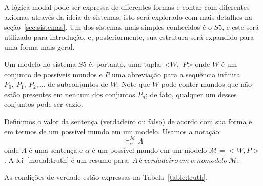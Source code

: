 A lógica modal pode ser expressa de diferentes formas e contar com diferentes
axiomas através da ideia de sistemas, isto será explorado com mais detalhes 
na seção~\ref{sec:sistemas}. Um dos sistemas mais simples conhecidos é o $S5$, e
este será utilizado para introdução, e, posteriormente, sua estrutura será
expandido para uma forma mais geral.

Um modelo no sistema $S5$ é, portanto, uma tupla:
<$W$,~$P$>
onde $W$ é um conjunto de possíveis mundos e $P$ uma abreviação para a sequência
infinita 
$P_0,\ P_1,\ P_2,\ldots$
de subconjuntos de $W$.
Note que $W$ pode conter mundos que não estão presentes em nenhum dos conjuntos
$P_n$; de fato, qualquer um desses conjuntos pode ser vazio.

Definimos o valor da sentença (verdadeiro ou falso) de acordo com sua forma e em
termos de um possível mundo em um modelo.
Usamos a notação:
\begin{equation}
    \label{modal:truth}
    \models ^{\mathcal{M}}_{\alpha} A 
\end{equation}
onde $A$ é uma sentença e $\alpha$ é um possível mundo em um modelo
$\mathcal{M}=<W,P>$.
A lei~\ref{modal:truth} é um resumo para: $A\ é\ verdadeiro\ em\ \alpha\ no
modelo\ \mathcal{M}$.

As condições de verdade estão expressas na Tabela~\ref{table:truth}.

